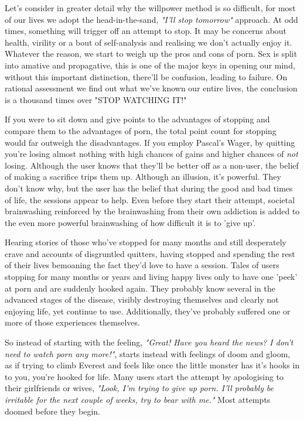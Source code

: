 \documentclass[easypeasy.tex]{subfiles}
\begin{document}
Let's consider in greater detail why the willpower method is so difficult, for most of our lives we adopt the head-in-the-sand, \textit{"I'll stop tomorrow"} approach. At odd times, something will trigger off an attempt to stop. It may be concerns about health, virility or a bout of self-analysis and realising we don't actually enjoy it. Whatever the reason, we start to weigh up the pros and cons of porn. Sex is split into amative and propagative, this is one of the major keys in opening our mind, without this important distinction, there'll be confusion, leading to failure. On rational assessment we find out what we've known our entire lives, the conclusion is a thousand times over "STOP WATCHING IT!"

If you were to sit down and give points to the advantages of stopping and compare them to the advantages of porn, the total point count for stopping would far outweigh the disadvantages. If you employ Pascal's Wager, by quitting you're losing almost nothing with high chances of gains and higher chances of \textit{not} losing. Although the user knows that they'll be better off as a non-user, the belief of making a sacrifice trips them up. Although an illusion, it's powerful. They don't know why, but the user has the belief that during the good and bad times of life, the sessions appear to help. Even before they start their attempt, societal brainwashing reinforced by the brainwashing from their own addiction is added to the even more powerful brainwashing of how difficult it is to 'give up'.

Hearing stories of those who've stopped for many months and still desperately crave and accounts of disgruntled quitters, having stopped and spending the rest of their lives bemoaning the fact they'd love to have a session. Tales of users stopping for many months or years and living happy lives only to have one 'peek' at porn and are suddenly hooked again. They probably know several in the advanced stages of the disease, visibly destroying themselves and clearly not enjoying life, yet continue to use. Additionally, they've probably suffered one or more of those experiences themselves.

So instead of starting with the feeling, \textit{"Great! Have you heard the news? I don't need to watch porn any more!"}, starts instead with feelings of doom and gloom, as if trying to climb Everest and feels like once the little monster has it's hooks in to you, you're hooked for life. Many users start the attempt by apologising to their girlfriends or wives, \textit{"Look, I'm trying to give up porn. I'll probably be irritable for the next couple of weeks, try to bear with me."} Most attempts doomed before they begin.
\end{document}
